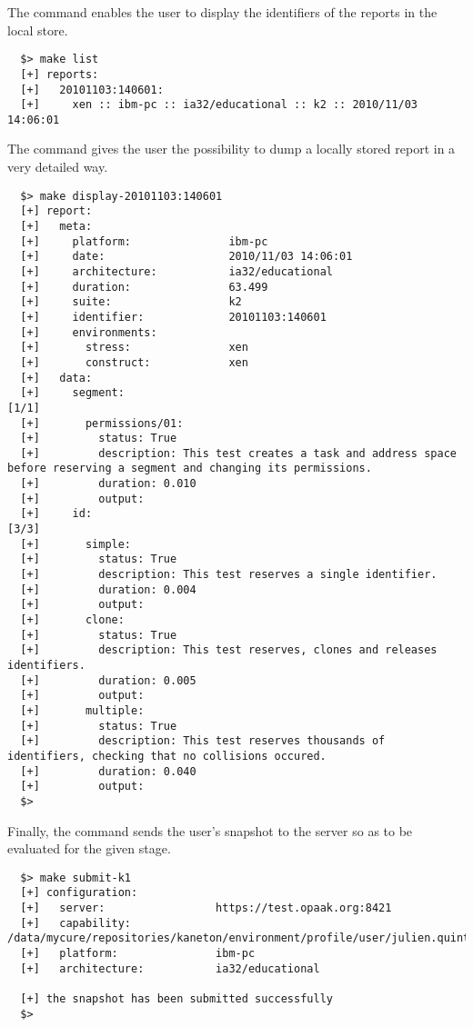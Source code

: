 The  command enables the user to display the identifiers of the
reports in the local store.

\begin{verbatim}
  $> make list
  [+] reports:
  [+]   20101103:140601:
  [+]     xen :: ibm-pc :: ia32/educational :: k2 :: 2010/11/03 14:06:01
\end{verbatim}

The  command gives the user the possibility to dump a locally
stored report in a very detailed way.

\begin{verbatim}
  $> make display-20101103:140601
  [+] report:
  [+]   meta:
  [+]     platform:               ibm-pc
  [+]     date:                   2010/11/03 14:06:01
  [+]     architecture:           ia32/educational
  [+]     duration:               63.499
  [+]     suite:                  k2
  [+]     identifier:             20101103:140601
  [+]     environments:
  [+]       stress:               xen
  [+]       construct:            xen
  [+]   data:
  [+]     segment:                                                        [1/1]
  [+]       permissions/01:
  [+]         status: True
  [+]         description: This test creates a task and address space before reserving a segment and changing its permissions.
  [+]         duration: 0.010
  [+]         output: 
  [+]     id:                                                             [3/3]
  [+]       simple:
  [+]         status: True
  [+]         description: This test reserves a single identifier.
  [+]         duration: 0.004
  [+]         output: 
  [+]       clone:
  [+]         status: True
  [+]         description: This test reserves, clones and releases identifiers.
  [+]         duration: 0.005
  [+]         output: 
  [+]       multiple:
  [+]         status: True
  [+]         description: This test reserves thousands of identifiers, checking that no collisions occured.
  [+]         duration: 0.040
  [+]         output: 
  $> 
\end{verbatim}

Finally, the  command sends the user's snapshot to the server
so as to be evaluated for the given stage.

\begin{verbatim}
  $> make submit-k1
  [+] configuration:
  [+]   server:                 https://test.opaak.org:8421
  [+]   capability:             /data/mycure/repositories/kaneton/environment/profile/user/julien.quintard/julien.quintard.cap
  [+]   platform:               ibm-pc
  [+]   architecture:           ia32/educational

  [+] the snapshot has been submitted successfully
  $> 
\end{verbatim}
